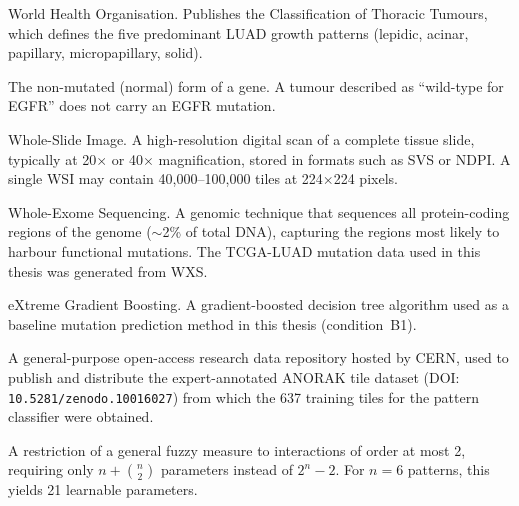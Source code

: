 \begin{description}[style=nextline,leftmargin=4cm]
\item[WHO] World Health Organisation.  Publishes the Classification of Thoracic Tumours, which defines the five predominant LUAD growth patterns (lepidic, acinar, papillary, micropapillary, solid).


\item[Wild-type] The non-mutated (normal) form of a gene.  A tumour described as ``wild-type for EGFR'' does not carry an EGFR mutation.


\item[WSI] Whole-Slide Image.  A high-resolution digital scan of a complete tissue slide, typically at 20$\times$ or 40$\times$ magnification, stored in formats such as SVS or NDPI.  A single WSI may contain 40{,}000--100{,}000 tiles at 224$\times$224 pixels.



\item[WXS] Whole-Exome Sequencing.  A genomic technique that sequences all protein-coding regions of the genome ($\sim$2\% of total DNA), capturing the regions most likely to harbour functional mutations.  The TCGA-LUAD mutation data used in this thesis was generated from WXS.


\item[XGBoost] eXtreme Gradient Boosting.  A gradient-boosted decision tree algorithm used as a baseline mutation prediction method in this thesis (condition~B1).


\item[Zenodo] A general-purpose open-access research data repository hosted by CERN, used to publish and distribute the expert-annotated ANORAK tile dataset (DOI: \texttt{10.5281/zenodo.10016027}) from which the 637 training tiles for the pattern classifier were obtained.


\item[2-additive (fuzzy measure)] A restriction of a general fuzzy measure to interactions of order at most 2, requiring only $n + \binom{n}{2}$ parameters instead of $2^n - 2$.  For $n = 6$ patterns, this yields 21 learnable parameters.



\end{description}